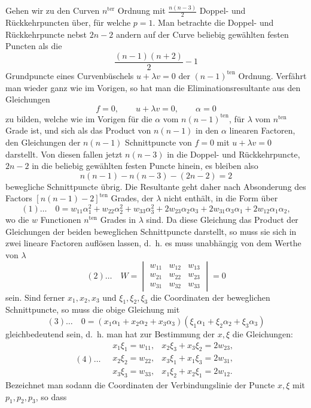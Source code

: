\documentclass[10pt]{article}
\begin{document}
Gehen wir zu den Curven \(n^{\text{ter}}\) Ordnung mit \(\frac{n(n-3)}{2}\) Doppel- und Rückkehrpuncten über, für welche \(p=1\). Man betrachte die Doppel- und Rückkehrpuncte nebst \(2n-2\) andern auf der Curve beliebig gewählten festen Puncten als die
\[
\frac{(n-1)(n+2)}{2}-1
\]
Grundpuncte eines Curvenbüschels \(u+\lambda v=0\) der \((n-1)^{\text{ten}}\) Ordnung. Verfährt man wieder ganz wie im Vorigen, so hat man die Eliminationsresultante aus den Gleichungen
\[
f=0,\qquad u+\lambda v=0,\qquad \alpha=0
\]
zu bilden, welche wie im Vorigen für die \(\alpha\) vom \(n(n-1)^{\text{ten}}\), für \(\lambda\) vom \(n^{\text{ten}}\) Grade ist, und sich als das Product von \(n(n-1)\) in den \(\alpha\) linearen Factoren, den Gleichungen der \(n(n-1)\) Schnittpuncte von \(f=0\) mit \(u+\lambda v=0\) darstellt. Von diesen fallen jetzt \(n(n-3)\) in die Doppel- und Rückkehrpuncte, \(2n-2\) in die beliebig gewählten festen Puncte hinein, es bleiben also
\[
n(n-1)-n(n-3)-(2n-2)=2
\]
bewegliche Schnittpuncte übrig. Die Resultante geht daher nach Absonderung des Factors \([n(n-1)-2]^{\text{ten}}\) Grades, der \(\lambda\) nicht enthält, in die Form über
\[
(1)\ldots\quad
0=w_{11}\alpha_1^2+w_{22}\alpha_2^2+w_{33}\alpha_3^2
+2w_{23}\alpha_2\alpha_3+2w_{31}\alpha_3\alpha_1+2w_{12}\alpha_1\alpha_2,
\]
wo die \(w\) Functionen \(n^{\text{ten}}\) Grades in \(\lambda\) sind. Da diese Gleichung das Product der Gleichungen der beiden beweglichen Schnittpuncte darstellt, so muss sie sich in zwei lineare Factoren auflösen lassen, d.\ h. es muss unabhängig von dem Werthe von \(\lambda\)
\[
(2)\ldots\quad
W=\begin{vmatrix}
w_{11}&w_{12}&w_{13}\\
w_{21}&w_{22}&w_{23}\\
w_{31}&w_{32}&w_{33}
\end{vmatrix}=0
\]
sein. Sind ferner \(x_1,x_2,x_3\) und \(\xi_1,\xi_2,\xi_3\) die Coordinaten der beweglichen Schnittpuncte, so muss die obige Gleichung mit
\[
(3)\ldots\quad
0=(x_1\alpha_1+x_2\alpha_2+x_3\alpha_3)(\xi_1\alpha_1+\xi_2\alpha_2+\xi_3\alpha_3)
\]
gleichbedeutend sein, d.\ h. man hat zur Bestimmung der \(x,\xi\) die Gleichungen:
\[
(4)\ldots\quad
\begin{array}{lll}
x_1\xi_1=w_{11},&
x_2\xi_3+x_3\xi_2=2w_{23},\\
x_2\xi_2=w_{22},&
x_3\xi_1+x_1\xi_3=2w_{31},\\
x_3\xi_3=w_{33},&
x_1\xi_2+x_2\xi_1=2w_{12}.
\end{array}
\]
Bezeichnet man sodann die Coordinaten der Verbindungslinie der Puncte \(x,\xi\) mit \(p_1,p_2,p_3\), so dass
\end{document}

